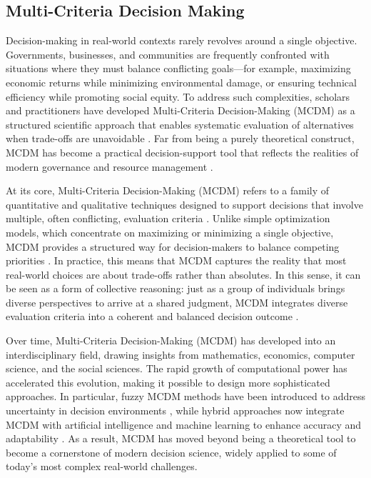 \subsection{Multi-Criteria Decision Making}
Decision-making in real-world contexts rarely revolves around a single objective. Governments, businesses, and communities are frequently confronted with situations where they must balance conflicting goals—for example, maximizing economic returns while minimizing environmental damage, or ensuring technical efficiency while promoting social equity. To address such complexities, scholars and practitioners have developed Multi-Criteria Decision-Making (MCDM) as a structured scientific approach that enables systematic evaluation of alternatives when trade-offs are unavoidable \cite{Aruldoss2013,Taherdoost2023}. Far from being a purely theoretical construct, MCDM has become a practical decision-support tool that reflects the realities of modern governance and resource management \cite{HUANG2011}.

At its core, Multi-Criteria Decision-Making (MCDM) refers to a family of quantitative and qualitative techniques designed to support decisions that involve multiple, often conflicting, evaluation criteria \cite{Aruldoss2013,Taherdoost2023}. Unlike simple optimization models, which concentrate on maximizing or minimizing a single objective, MCDM provides a structured way for decision-makers to balance competing priorities \cite{KUMAR2017596,jones2010}. In practice, this means that MCDM captures the reality that most real-world choices are about trade-offs rather than absolutes. In this sense, it can be seen as a form of collective reasoning: just as a group of individuals brings diverse perspectives to arrive at a shared judgment, MCDM integrates diverse evaluation criteria into a coherent and balanced decision outcome \cite{Borges2020,Cinalli2015}.

Over time, Multi-Criteria Decision-Making (MCDM) has developed into an interdisciplinary field, drawing insights from mathematics, economics, computer science, and the social sciences. The rapid growth of computational power has accelerated this evolution, making it possible to design more sophisticated approaches. In particular, fuzzy MCDM methods have been introduced to address uncertainty in decision environments \cite{LIANG1999,Mardani2015}, while hybrid approaches now integrate MCDM with artificial intelligence and machine learning to enhance accuracy and adaptability \cite{karakus2022}. As a result, MCDM has moved beyond being a theoretical tool to become a cornerstone of modern decision science, widely applied to some of today’s most complex real-world challenges.

